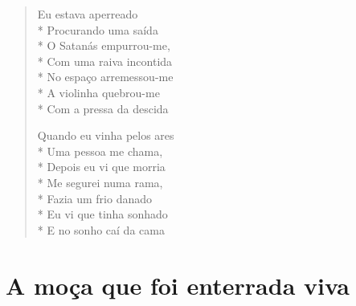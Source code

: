 \begin{verse}
Eu estava aperreado\\*
Procurando uma saída\\*
O Satanás empurrou-me,\\*
Com uma raiva incontida\\*
No espaço arremessou-me\\*
A violinha quebrou-me\\*
Com a pressa da descida

Quando eu vinha pelos ares\\*
Uma pessoa me chama,\\*
Depois eu vi que morria\\*
Me segurei numa rama,\\*
Fazia um frio danado\\*
Eu vi que tinha sonhado\\*
E no sonho caí da cama

\end{verse}

\chapter{A moça que foi enterrada viva}

